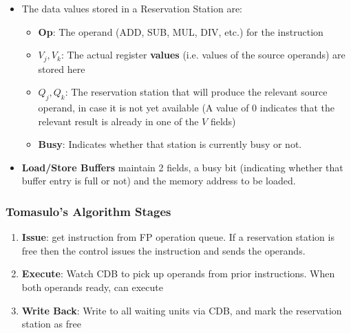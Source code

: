 \documentclass{article}
\begin{document}
\begin{itemize}
    \item The data values stored in a Reservation Station are:
    \begin{itemize}
        \item \textbf{Op}: The operand (ADD, SUB, MUL, DIV, etc.) for the instruction
        
        \item $V_j, V_k$: The actual register \textbf{values} (i.e. values of the source operands) are stored here
        
        \item $Q_j, Q_k$: The reservation station that will produce the relevant source operand, in case it is not yet available (A value of 0 indicates that the relevant result is already in one of the $V$ fields)
        
        \item \textbf{Busy}: Indicates whether that station is currently busy or not. 
    \end{itemize}
    
    \item \textbf{Load/Store Buffers} maintain 2 fields, a busy bit (indicating whether that buffer entry is full or not) and the memory address to be loaded. 
\end{itemize}

\subsubsection{Tomasulo's Algorithm Stages}
\begin{enumerate}
    \item \textbf{Issue}: get instruction from FP operation queue. If a reservation station is free then the control issues the instruction and sends the operands.
    
    \item \textbf{Execute}: Watch CDB to pick up operands from prior instructions. When both operands ready, can execute
    
    \item \textbf{Write Back}: Write to all waiting units via CDB, and mark the reservation station as free
\end{enumerate}
\end{document}
